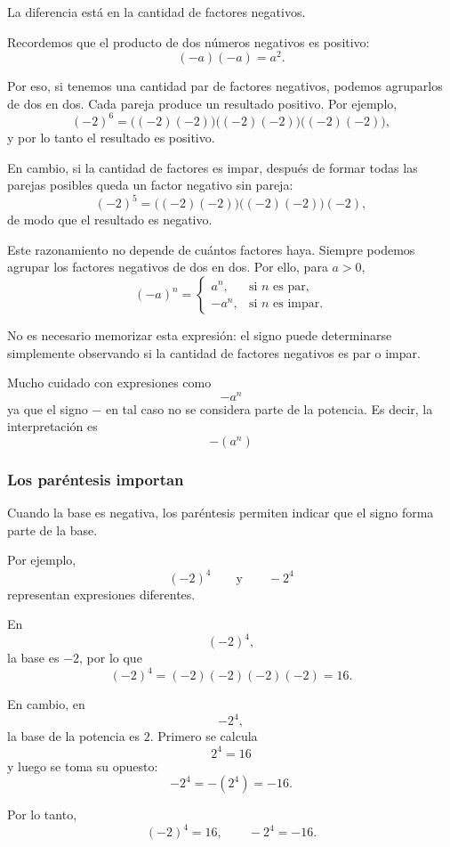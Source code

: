 La diferencia está en la cantidad de factores negativos.

Recordemos que el producto de dos números negativos es positivo:
\[
(-a)(-a)=a^2.
\]

Por eso, si tenemos una cantidad par de factores negativos, podemos agruparlos de dos en dos. Cada pareja produce un resultado positivo. Por ejemplo,
\[
(-2)^6
=
\bigl((-2)(-2)\bigr)
\bigl((-2)(-2)\bigr)
\bigl((-2)(-2)\bigr),
\]
y por lo tanto el resultado es positivo.

En cambio, si la cantidad de factores es impar, después de formar todas las parejas posibles queda un factor negativo sin pareja:
\[
(-2)^5
=
\bigl((-2)(-2)\bigr)
\bigl((-2)(-2)\bigr)
(-2),
\]
de modo que el resultado es negativo.

Este razonamiento no depende de cuántos factores haya. Siempre podemos agrupar los factores negativos de dos en dos. Por ello, para \(a>0\),
\[
(-a)^n=
\begin{cases}
a^n, & \text{si \(n\) es par},\\[4pt]
-a^n, & \text{si \(n\) es impar}.
\end{cases}
\]

No es necesario memorizar esta expresión: el signo puede determinarse simplemente observando si la cantidad de factores negativos es par o impar.

\begin{note}
  Mucho cuidado con expresiones como 
  \[
    -a^n
  \]
  ya que el signo \(-\) en tal caso no se considera parte de la potencia. Es decir, la interpretación es 
  \[
    - (a^n)
  \]
\end{note}

\subsubsection{Los paréntesis importan}

Cuando la base es negativa, los paréntesis permiten indicar que el signo forma parte de la base.

Por ejemplo,
\[
(-2)^4
\qquad\text{y}\qquad
-2^4
\]
representan expresiones diferentes.

En
\[
(-2)^4,
\]
la base es \(-2\), por lo que
\[
(-2)^4
=
(-2)(-2)(-2)(-2)
=
16.
\]

En cambio, en
\[
-2^4,
\]
la base de la potencia es \(2\). Primero se calcula
\[
2^4=16
\]
y luego se toma su opuesto:
\[
-2^4=-(2^4)=-16.
\]

Por lo tanto,
\[
(-2)^4=16,
\qquad
-2^4=-16.
\]

